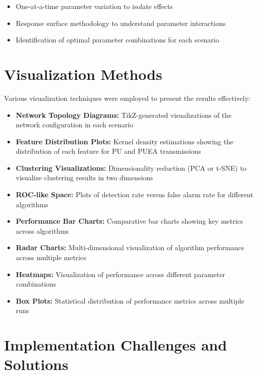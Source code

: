 \begin{itemize}
    \item One-at-a-time parameter variation to isolate effects
    \item Response surface methodology to understand parameter interactions
    \item Identification of optimal parameter combinations for each scenario
\end{itemize}

\section{Visualization Methods}

Various visualization techniques were employed to present the results effectively:

\begin{itemize}
    \item \textbf{Network Topology Diagrams:} TikZ-generated visualizations of the network configuration in each scenario
    
    \item \textbf{Feature Distribution Plots:} Kernel density estimations showing the distribution of each feature for PU and PUEA transmissions
    
    \item \textbf{Clustering Visualizations:} Dimensionality reduction (PCA or t-SNE) to visualize clustering results in two dimensions
    
    \item \textbf{ROC-like Space:} Plots of detection rate versus false alarm rate for different algorithms
    
    \item \textbf{Performance Bar Charts:} Comparative bar charts showing key metrics across algorithms
    
    \item \textbf{Radar Charts:} Multi-dimensional visualization of algorithm performance across multiple metrics
    
    \item \textbf{Heatmaps:} Visualization of performance across different parameter combinations
    
    \item \textbf{Box Plots:} Statistical distribution of performance metrics across multiple runs
\end{itemize}

\section{Implementation Challenges and Solutions}

